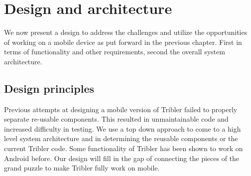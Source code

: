 \chapter{Design and architecture}

We now present a design to address the challenges and utilize the opportunities of working on a mobile device as put forward in the previous chapter.
First in terms of functionality and other requirements, second the overall system architecture.


\section{Design principles}
Previous attempts at designing a mobile version of Tribler failed to properly separate re-usable components.
This resulted in unmaintainable code and increased difficulty in testing.
We use a top down approach to come to a high level system architecture and in determining the reusable components or the current Tribler code.
Some functionality of Tribler has been shown to work on Android before.
Our design will fill in the gap of connecting the pieces of the grand puzzle to make Tribler fully work on mobile.

